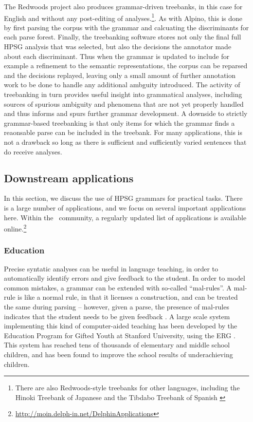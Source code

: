 \documentclass[output=paper,nonflat]{langsci/langscibook}
\begin{document}
The Redwoods project \citep{OFTM2004a-u} also produces grammar-driven
treebanks, in this case for English and without any post-editing of
analyses.\footnote{There are also Redwoods-style treebanks for other
  languages, including the Hinoki Treebank of Japanese
  \citep{bond:etal:2004} and the Tibdabo Treebank of Spanish
  \citep{marimon:2015}}.  As with Alpino, this is done by first
parsing the corpus with the grammar and calcuating the discriminants
for each parse forest.  Finally, the treebanking software stores not
only the final full HPSG analysis that was selected, but also the
decisions the annotator made about each discriminant. Thus when the
grammar is updated to include for example a refinement to the semantic
representations, the corpus can be reparsed and the decisions
replayed, leaving only a small amount of further annotation work to be
done to handle any additional ambguity introduced. The activity of
treebanking in turn provides useful insight into grammatical analyses,
including sources of spurious ambiguity and phenomena that are not yet
properly handled and thus informs and spurs further grammar
development.  A downside to strictly grammar-based treebanking is that
only items for which the grammar finds a reaonsable parse can be
included in the treebank. For many applications, this is not a
drawback so long as there is sufficient and sufficiently varied
sentences that do receive analyses.




\subsection{Downstream applications}
\label{cl:downstream}

In this section, we discuss
the use of HPSG grammars for practical tasks.
There is a large number of applications,
and we focus on several important applications here.
Within the \delphin\ community,
a regularly updated list of applications is available online.\footnote{%
	\url{http://moin.delph-in.net/DelphinApplications}
}


\subsubsection{Education}
\label{cl:downstream:edu}

Precise syntatic analyses can be useful in language teaching,
in order to automatically identify errors and give feedback to the student.
In order to model common mistakes,
a grammar can be extended with so-called ``mal-rules''.
A mal-rule is like a normal rule, in that it licenses a construction,
and can be treated the same during parsing
-- however, given a parse,
the presence of mal-rules indicates that the student needs to be given feedback
\citep{Ben:Fli:Oep:04,flickinger2013error,morgadodacosta2016error}.
A large scale system implementing this kind of computer-aided teaching has been developed
by the Education Program for Gifted Youth at Stanford University,
using the ERG \citep{suppes2014teach}.
This system has reached tens of thousands of elementary and middle school children,
and has been found to improve the school results of underachieving children.
\end{document}
